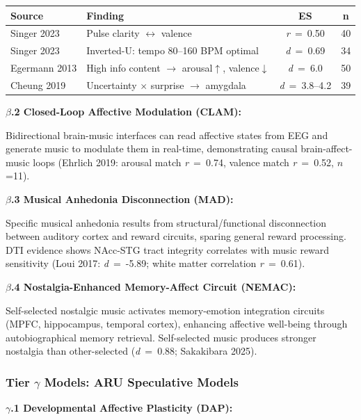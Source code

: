 \documentclass[9pt,onecolumn]{article}
\newcommand{\cohend}[1]{\textit{d}~=~#1}
\newcommand{\correlation}[1]{\textit{r}~=~#1}
\begin{document}
\begin{center}
\small
\begin{tabular}{@{}llcc@{}}
\toprule
\textbf{Source} & \textbf{Finding} & \textbf{ES} & \textbf{n} \\
\midrule
Singer 2023 & Pulse clarity $\leftrightarrow$ valence & \correlation{0.50} & 40 \\
Singer 2023 & Inverted-U: tempo 80--160 BPM optimal & \cohend{0.69} & 34 \\
Egermann 2013 & High info content $\rightarrow$ arousal$\uparrow$, valence$\downarrow$ & \cohend{6.0} & 50 \\
Cheung 2019 & Uncertainty $\times$ surprise $\rightarrow$ amygdala & \cohend{3.8--4.2} & 39 \\
\bottomrule
\end{tabular}
\end{center}

\textbf{$\beta$.2 Closed-Loop Affective Modulation (CLAM):}

Bidirectional brain-music interfaces can read affective states from EEG and generate music to modulate them in real-time, demonstrating causal brain-affect-music loops (Ehrlich 2019: arousal match \correlation{0.74}, valence match \correlation{0.52}, $n$=11).

\textbf{$\beta$.3 Musical Anhedonia Disconnection (MAD):}

Specific musical anhedonia results from structural/functional disconnection between auditory cortex and reward circuits, sparing general reward processing. DTI evidence shows NAcc-STG tract integrity correlates with music reward sensitivity (Loui 2017: \cohend{-5.89}; white matter correlation \correlation{0.61}).

\textbf{$\beta$.4 Nostalgia-Enhanced Memory-Affect Circuit (NEMAC):}

Self-selected nostalgic music activates memory-emotion integration circuits (MPFC, hippocampus, temporal cortex), enhancing affective well-being through autobiographical memory retrieval. Self-selected music produces stronger nostalgia than other-selected (\cohend{0.88}; Sakakibara 2025).

\subsubsection{Tier $\gamma$ Models: ARU Speculative Models}

\textbf{$\gamma$.1 Developmental Affective Plasticity (DAP):}
\end{document}
